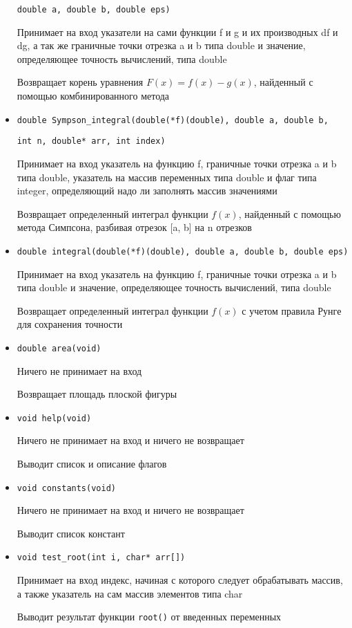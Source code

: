 \documentclass[a4paper,12pt,titlepage,finall]{article}
\begin{document}
\begin{itemize}
{\texttt{double a, double b, double eps)}} \par
Принимает на вход указатели на сами функции f и g и их производных df и dg, а так же граничные точки отрезка a и b типа double и значение, определяющее точность вычислений, типа double\par
Возвращает корень уравнения $F(x) = f(x) - g(x)$, найденный с помощью комбинированного метода
\item {\texttt{double Sympson\_integral(double(*f)(double), double a, double b, } \par
\texttt{int n, double* arr, int index)}} \par
Принимает на вход указатель на функцию f, граничные точки отрезка a и b типа double, указатель на массив переменных типа double и флаг типа integer, определяющий надо ли заполнять массив значениями\par
Возвращает определенный интеграл функции $f(x)$, найденный с помощью метода Симпсона, разбивая отрезок [a, b] на n отрезков
\item {\texttt{double integral(double(*f)(double), double a, double b, double eps)}} \par
Принимает на вход указатель на функцию f, граничные точки отрезка a и b типа double и значение, определяющее точность вычислений, типа double\par
Возвращает определенный интеграл функции $f(x)$ с учетом правила Рунге для сохранения точности
\item {\texttt{double area(void)}} \par
Ничего не принимает на вход\par
Возвращает площадь плоской фигуры
\item {\texttt{void help(void)}} \par
Ничего не принимает на вход и ничего не возвращает\par
Выводит список и описание флагов
\item {\texttt{void constants(void)}} \par
Ничего не принимает на вход и ничего не возвращает\par
Выводит список констант
\item {\texttt{void test\_root(int i, char* arr[])}} \par
Принимает на вход индекс, начиная с которого следует обрабатывать массив, а также указатель на сам массив элементов типа char\par
Выводит результат функции \texttt{root()} от введенных переменных\par

\end{itemize}
\end{document}
